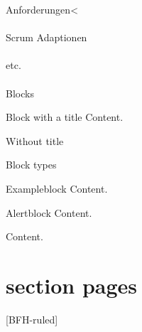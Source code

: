 \documentclass[
    ngerman,%
    authorontitle=true,
]{bfhbeamer}
\begin{document}
    \begin{frame}{Anforderungen}<
        \framesubtitle{}
    \end{frame}

    \begin{frame}{Scrum Adaptionen}
        \framesubtitle{}
    \end{frame}

    \begin{frame}{etc.}
        \framesubtitle{}
    \end{frame}

    \begin{frame}{Blocks}
        \begin{block}{Block with a title}
            Content.
        \end{block}
        \begin{block}{}
            Without title
        \end{block}
    \end{frame}

    \begin{frame}{Block types}
        \begin{exampleblock}{Exampleblock}
            Content.
        \end{exampleblock}
        \begin{alertblock}{Alertblock}
            Content.
        \end{alertblock}
        \begin{example}
            Content.
        \end{example}
    \end{frame}

    \section{section pages}

    [BFH-ruled]
    \frame{\sectionpage}





\end{document}
